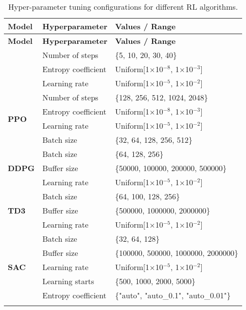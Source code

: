 \begin{longtable}{|l|l|p{8cm}|}
    \hline
    \textbf{Model} & \textbf{Hyperparameter} & \textbf{Values / Range} \\ \midrule
    \endfirsthead

    \hline
    \textbf{Model} & \textbf{Hyperparameter} & \textbf{Values / Range} \\ \midrule
    \endhead

    \endfoot

    \multirow{3}{*}{\textbf{A2C}}
    & Number of steps & \{5, 10, 20, 30, 40\} \\
    & Entropy coefficient & Uniform[1$\times$10$^{-8}$, 1$\times$10$^{-3}$] \\ 
    & Learning rate & Uniform[1$\times$10$^{-5}$, 1$\times$10$^{-2}$] \\ \hline

    \multirow{4}{*}{\textbf{PPO}}
    & Number of steps & \{128, 256, 512, 1024, 2048\} \\ 
    & Entropy coefficient & Uniform[1$\times$10$^{-8}$, 1$\times$10$^{-3}$] \\ 
    & Learning rate & Uniform[1$\times$10$^{-5}$, 1$\times$10$^{-2}$] \\ 
    & Batch size & \{32, 64, 128, 256, 512\} \\ \hline

    \multirow{3}{*}{\textbf{DDPG}}
    & Batch size & \{64, 128, 256\} \\ 
    & Buffer size & \{50000, 100000, 200000, 500000\} \\ 
    & Learning rate & Uniform[1$\times$10$^{-5}$, 1$\times$10$^{-2}$] \\ \hline

    \multirow{3}{*}{\textbf{TD3}}
    & Batch size & \{64, 100, 128, 256\} \\ 
    & Buffer size & \{500000, 1000000, 2000000\} \\ 
    & Learning rate & Uniform[1$\times$10$^{-5}$, 1$\times$10$^{-2}$] \\ \hline

    \multirow{5}{*}{\textbf{SAC}}
    & Batch size & \{32, 64, 128\} \\ 
    & Buffer size & \{100000, 500000, 1000000, 2000000\} \\ 
    & Learning rate & Uniform[1$\times$10$^{-5}$, 1$\times$10$^{-2}$] \\ 
    & Learning starts & \{500, 1000, 2000, 5000\} \\ 
    & Entropy coefficient & \{"auto", "auto\_0.1", "auto\_0.01"\} \\ \hline
    \caption{Hyper-parameter tuning configurations for different RL algorithms.}
    \label{tab:model_hyperparameters}
\end{longtable}